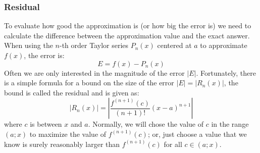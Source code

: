 \subsubsection{Residual}
To evaluate how good the approximation is (or how big the error is) we need to calculate the difference between the approximation value and the exact answer. When using the $n$-th order Taylor series $P_n(x)$ centered at $a$ to approximate $f(x)$, the error is:
\begin{equation}
	E = f(x) - P_n(x)
\end{equation}
Often we are only interested in the magnitude of the error $|E|$. Fortunately, there is a simple formula for a bound on the size of the error $|E| = \left| R_n(x) \right|$, the bound is called the residual and is given as:
\begin{equation}
	\left| R_n(x) \right| = \left| \frac{f^{(n+1)}(c)}{(n+1)!}(x-a)^{n+1} \right|
\end{equation}
where $c$ is between $x$ and $a$. Normally, we will chose the value of $c$ in the range $(a;x)$ to maximize the value of $f^{(n+1)}(c)$; or, just choose a value that we know is surely reasonably larger than $f^{(n+1)}(c)$ for all $c \in (a;x)$. 

\begin{center}
\begin{footnotesize}
\end{footnotesize}
\end{center}



